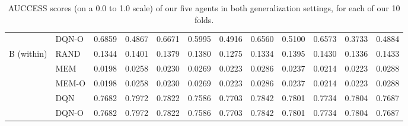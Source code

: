 \documentclass{article}
\begin{document}
\begin{table*}[!h]
\begin{tabular}{llrrrrrrrrrr}
           & DQN-O &  0.6859 &  0.4867 &  0.6671 &  0.5995 &  0.4916 &  0.6560 &  0.5100 &  0.6573 &  0.3733 &  0.4884 \\
B (within) & RAND &  0.1344 &  0.1401 &  0.1379 &  0.1380 &  0.1275 &  0.1334 &  0.1395 &  0.1430 &  0.1336 &  0.1433 \\
           & MEM &  0.0198 &  0.0258 &  0.0230 &  0.0269 &  0.0223 &  0.0286 &  0.0237 &  0.0214 &  0.0223 &  0.0288 \\
           & MEM-O &  0.0198 &  0.0258 &  0.0230 &  0.0269 &  0.0223 &  0.0286 &  0.0237 &  0.0214 &  0.0223 &  0.0288 \\
           & DQN &  0.7682 &  0.7972 &  0.7822 &  0.7586 &  0.7703 &  0.7842 &  0.7801 &  0.7734 &  0.7804 &  0.7687 \\
           & DQN-O &  0.7682 &  0.7972 &  0.7822 &  0.7586 &  0.7703 &  0.7842 &  0.7801 &  0.7734 &  0.7804 &  0.7687 \\
\bottomrule
\end{tabular}
   \caption{\label{tbl:auccess_all_seeds}AUCCESS scores (on a 0.0 to 1.0 scale) of our five agents in both generalization settings, for each of our 10 folds.}
\end{table*}
 
\end{document}
